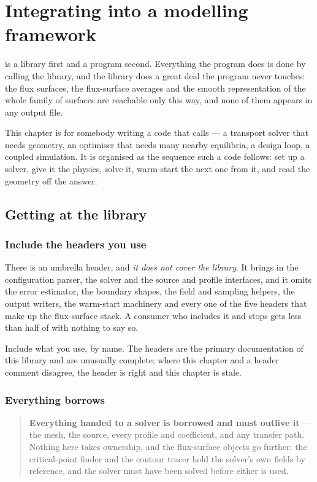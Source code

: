 \chapter{Integrating {\meq} into a modelling framework}
\label{ch:embedding}

{\meq} is a library first and a program second. Everything the program does is
done by calling the library, and the library does a great deal the program never
touches: the flux surfaces, the flux-surface averages and the smooth
representation of the whole family of surfaces are reachable only this way, and
none of them appears in any output file.

This chapter is for somebody writing a code that calls {\meq} --- a transport
solver that needs geometry, an optimiser that needs many nearby equilibria, a
design loop, a coupled simulation. It is organised as the sequence such a code
follows: set up a solver, give it the physics, solve it, warm-start the next one
from it, and read the geometry off the answer.

\section{Getting at the library}

\subsection{Include the headers you use}

There is an umbrella header, and \emph{it does not cover the library}. It brings
in the configuration parser, the solver and the source and profile interfaces,
and it omits the error estimator, the boundary shapes, the field and sampling
helpers, the output writers, the warm-start machinery and every one of the five
headers that make up the flux-surface stack. A consumer who includes it and
stops gets less than half of {\meq} with nothing to say so.

Include what you use, by name. The headers are the primary documentation of this
library and are unusually complete; where this chapter and a header comment
disagree, the header is right and this chapter is stale.

\subsection{Everything borrows}

\begin{quote}
	\textbf{Everything handed to a solver is borrowed and must outlive it}
	--- the mesh, the source, every profile and coefficient, and any transfer
	path. Nothing here takes ownership, and
	the flux-surface objects go further: the critical-point finder and the
	contour tracer hold the solver's own fields by reference, and the solver must
	have been solved before either is used.
\end{quote}

